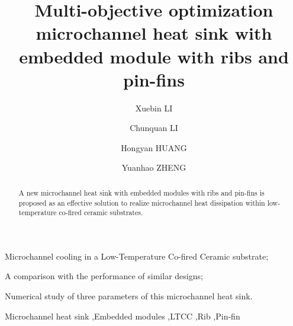 \documentclass[preprint,5p,sort&compress,times,10pt]{elsarticle} %
\begin{document}

\begin{frontmatter}


    \title{Multi-objective optimization microchannel heat sink with embedded module with ribs and pin-fins}

    \author[rvt]{Xuebin LI}
    \author[rvt]{Chunquan LI}
    \author[rvt]{Hongyan HUANG}%
    \author[rvt]{Yuanhao ZHENG}%




    \begin{abstract}
        A new microchannel heat sink with embedded modules with ribs and pin-fins is proposed as an effective solution to realize microchannel heat dissipation within low-temperature co-fired ceramic substrates.
    \end{abstract}



    \begin{highlights}
        \item Microchannel cooling in a Low-Temperature Co-fired Ceramic substrate;
        \item A comparison with the performance of similar designs;
        \item Numerical study of three parameters of this microchannel heat sink.
    \end{highlights}

    \begin{keyword}
        Microchannel heat sink \sep Embedded modules \sep LTCC \sep Rib \sep Pin-fin
    \end{keyword}

\end{frontmatter}
\end{document}
